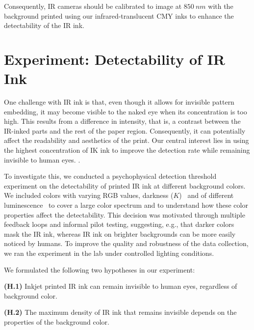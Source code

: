 Consequently, IR cameras should be calibrated to image at $850~nm$ with the background printed using our infrared-translucent CMY inks to enhance the detectability of the IR ink.




\vspace{0.3cm}





\section{Experiment: Detectability of IR Ink}
\label{visibility-experiment}



One challenge with IR ink is that, even though it allows for invisible pattern embedding, it may become visible to the naked eye when its concentration is too high. This results from a difference in intensity, that is, a contrast between the IR-inked parts and the rest of the paper region. Consequently, it can potentially affect the readability and aesthetics of the print. Our central interest lies in using the highest concentration of IK ink to improve the detection rate while remaining invisible to human eyes. .  



To investigate this, we conducted a psychophysical detection threshold experiment on the detectability of printed IR ink at different background colors. We included colors with varying RGB values, darkness ($K$)~\cite{li_black_2013} and of different luminescence~\cite{ridpath_techniques_2000} to cover a large color spectrum and to understand how these color properties affect the detectability. This decision was motivated through multiple feedback loops and informal pilot testing, suggesting, e.g., that darker colors mask the IR ink, whereas IR ink on brighter backgrounds can be more easily noticed by humans. To improve the quality and robustness of the data collection, we ran the experiment in the lab under controlled lighting conditions. 

We formulated the following two hypotheses in our experiment:

\textbf{(H.1)} Inkjet printed IR ink can remain invisible to human eyes, regardless of background color.

\textbf{(H.2)} The maximum density of IR ink that remains invisible depends on the properties of the background color.


